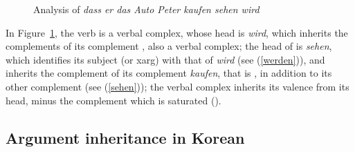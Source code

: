 \documentclass[output=paper]{langsci/langscibook}
\begin{document}
\begin{figure}

		\caption{Analysis of \emph{dass er das Auto Peter kaufen sehen wird}}\label{struc-30b}
\end{figure}
	
	In Figure~\ref{struc-30b}, the verb  is a verbal complex, whose head is \textit{wird}, which inherits the complements of its complement , also a verbal complex;  the head of  is \textit{sehen}, which identifies its subject (or xarg) with that of \textit{wird} (see (\ref{werden})), and inherits the complement of its complement \textit{kaufen}, that is , in addition to its other complement  (see (\ref{sehen})); the verbal complex  inherits its valence from its head, minus the complement which is saturated (). 
	
	
	\subsection{Argument inheritance in Korean}
	
\end{document}
